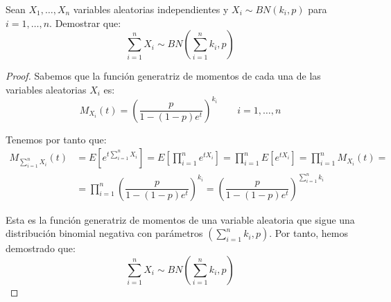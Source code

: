 \documentclass[12pt]{article}
\begin{document}
    
    \begin{ejercicio}
        Sean $X_1, \dots, X_n$ variables aleatorias independientes y $X_i\sim BN(k_i, p)$ para $i=1,\dots,n$. Demostrar que:
        \begin{equation*}
            \sum_{i=1}^{n}X_i \sim BN\left(\sum_{i=1}^{n}k_i, p\right)
        \end{equation*}
        \begin{proof}
            Sabemos que la función generatriz de momentos de cada una de las variables aleatorias $X_i$ es:
            \begin{equation*}
                M_{X_i}(t) = \left(\dfrac{p}{1-(1-p)e^t}\right)^{k_i} \qquad i=1,\dots,n
            \end{equation*}
    
            Tenemos por tanto que:
            \begin{align*}
                M_{\sum\limits_{i=1}^{n}X_i}(t) &= E\left[e^{t\sum\limits_{i=1}^{n}X_i}\right] = E\left[\prod_{i=1}^{n}e^{tX_i}\right] = \prod_{i=1}^{n}E[e^{tX_i}] = \prod_{i=1}^{n}M_{X_i}(t) =\\
                &= \prod_{i=1}^{n}\left(\dfrac{p}{1-(1-p)e^t}\right)^{k_i} = \left(\dfrac{p}{1-(1-p)e^t}\right)^{\sum\limits_{i=1}^{n}k_i}
            \end{align*}
    
            Esta es la función generatriz de momentos de una variable aleatoria que sigue una distribución binomial negativa con parámetros $\left(\sum\limits_{i=1}^{n}k_i, p\right)$. Por tanto, hemos demostrado que:
            \begin{equation*}
                \sum_{i=1}^{n}X_i \sim BN\left(\sum_{i=1}^{n}k_i, p\right)
            \end{equation*}
        \end{proof}
    \end{ejercicio}
\end{document}
